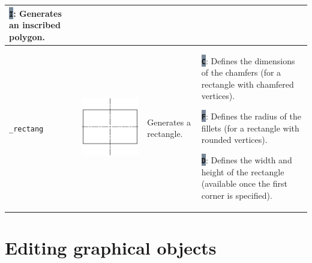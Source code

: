 \documentclass[..]{../IEEEphot}
\newcommand{\param}[1]{\colorbox{LightSlateGray}{\color{Navy}\texttt{\textbf{#1}}}}
\begin{document}
\begin{center}
\begin{longtable}{m{.1\linewidth}m{.2\linewidth}m{.3\linewidth}m{.3\linewidth}}
\param{I}: Generates an inscribed polygon.  \\
\midrule
\texttt{\_rectang} & \includegraphics[width = 0.8\linewidth, keepaspectratio]{../images/jpg/_rectang.jpg} & Generates a rectangle. & 
\param{C}: Defines the dimensions of the chamfers (for a rectangle with chamfered vertices).

\param{F}: Defines the radius of the fillets (for a rectangle with rounded vertices).

\param{D}: Defines the width and height of the rectangle (available once the first corner is specified).

\\
\bottomrule
\end{longtable}
\end{center}

\clearpage

\section{Editing graphical objects}
\end{document}
